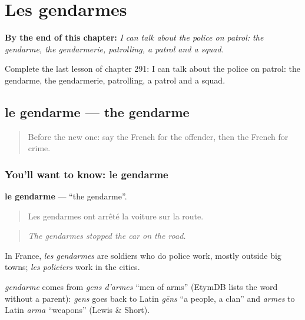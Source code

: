 
\chapter{Les gendarmes}
\label{ch:fr-les-gendarmes}

\begin{chapteropening}
\textbf{By the end of this chapter:} \emph{I can talk about the police on patrol: the gendarme, the gendarmerie, patrolling, a patrol and a squad.}

Complete the last lesson of chapter 291: I can talk about the police on patrol: the gendarme, the gendarmerie, patrolling, a patrol and a squad.
\end{chapteropening}

\section[le gendarme]{le gendarme — the gendarme}

\label{lesson:FR-C291-gendarme}



\begin{quote}
Before the new one: say the French for the offender, then the French for crime.
\end{quote}

\subsection*{You'll want to know: le gendarme}
\textbf{le gendarme} — \textquotedblleft{}the gendarme\textquotedblright{}.

\begin{quote}
Les gendarmes ont arrêté la voiture sur la route.
\end{quote}

\begin{quote}
\emph{The gendarmes stopped the car on the road.}
\end{quote}

In France, \emph{les gendarmes} are soldiers who do police work, mostly outside big towns; \emph{les policiers} work in the cities.

\begin{cousinweb}
\emph{gendarme} comes from \emph{gens d'armes} \textquotedblleft{}men of arms\textquotedblright{} (EtymDB lists the word without a parent): \emph{gens} goes back to Latin \emph{gēns} \textquotedblleft{}a people, a clan\textquotedblright{} and \emph{armes} to Latin \emph{arma} \textquotedblleft{}weapons\textquotedblright{} (Lewis \& Short).
\end{cousinweb}


